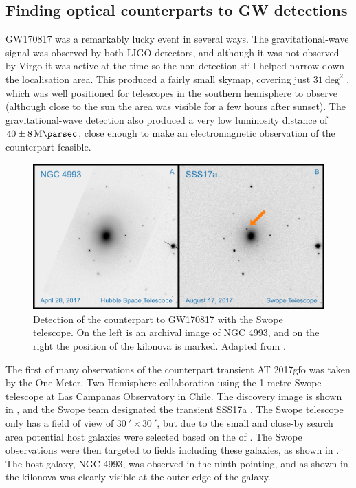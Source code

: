 \subsection{Finding optical counterparts to GW detections}
\label{sec:followup}
\begin{colsection}

GW170817 was a remarkably lucky event in several ways. The gravitational-wave signal was observed by both LIGO detectors, and although it was not observed by Virgo it was active at the time so the non-detection still helped narrow down the localisation area. This produced a fairly small skymap, covering just $31~\text{deg}^2$ \citep[see ]{GW170817}, which was well positioned for telescopes in the southern hemisphere to observe (although close to the sun the area was visible for a few hours after sunset). The gravitational-wave detection also produced a very low luminosity distance of $40\pm\SI{8}{\mega\parsec}$, close enough to make an electromagnetic observation of the counterpart feasible.

\newpage

\begin{figure}[t]
    \begin{center}
        \includegraphics[width=0.8\linewidth]{images/sss17a.pdf}
    \end{center}
    \caption[Detection of the counterpart to GW170817]{
        Detection of the counterpart to GW170817 with the Swope telescope. On the left is an archival image of NGC 4993, and on the right the position of the kilonova is marked. Adapted from \citet{GW170817_Swope}.
        }\label{fig:sss17a}
\end{figure}

The first of many observations of the counterpart transient AT 2017gfo was taken by the One-Meter, Two-Hemisphere collaboration using the 1-metre Swope telescope at Las Campanas Observatory in Chile. The discovery image is shown in , and the Swope team designated the transient SSS17a \citep{GW170817_Swope}. The Swope telescope only has a field of view of $\SI{30}{\arcmin}\times\SI{30}{\arcmin}$, but due to the small and close-by search area potential host galaxies were selected based on the  of \citet{GWGC}. The Swope observations were then targeted to fields including these galaxies, as shown in . The host galaxy, NGC 4993, was observed in the ninth pointing, and as shown in  the kilonova was clearly visible at the outer edge of the galaxy.


\end{colsection}
